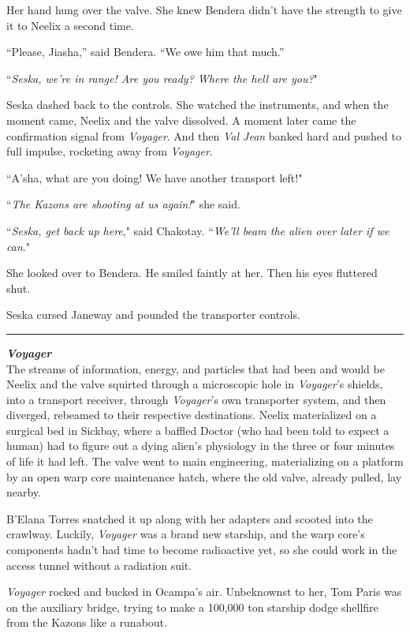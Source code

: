 \documentclass[twoside,letterpaper,12pt]{memoir}
\begin{document}
Her hand hung over the valve. She knew Bendera didn’t have the strength to give it to Neelix a second time.

“Please, Jiasha,” said Bendera. “We owe him that much.”

``\textit{Seska, we're in range! Are you ready? Where the hell are you?}"

Seska dashed back to the controls. She watched the instruments, and when the moment came, Neelix and the valve dissolved. A moment later came the confirmation signal from \textit{Voyager}. And then \textit{Val Jean} banked hard and pushed to full impulse, rocketing away from \textit{Voyager}.

``A'sha, what are you doing! We have another transport left!"

``\textit{The Kazons are shooting at us again!}" she said.

``\textit{Seska, get back up here}," said Chakotay. ``\textit{We'll beam the alien over later if we can}."

She looked over to Bendera. He smiled faintly at her. Then his eyes fluttered shut.

Seska cursed Janeway and pounded the transporter controls.

\begin{center}\rule{3cm}{0.4 pt}\end{center}

\noindent\textit{\textbf{Voyager}}\\

The streams of information, energy, and particles that had been and would be Neelix and the valve squirted through a microscopic hole in \textit{Voyager}'s shields, into a transport receiver, through \textit{Voyager}'s own transporter system, and then diverged, rebeamed to their respective destinations. Neelix materialized on a surgical bed in Sickbay, where a baffled Doctor (who had been told to expect a human) had to figure out a dying alien's physiology in the three or four minutes of life it had left. The valve went to main engineering, materializing on a platform by an open warp core maintenance hatch, where the old valve, already pulled, lay nearby.

B'Elana Torres snatched it up along with her adapters and scooted into the crawlway. Luckily, \textit{Voyager} was a brand new starship, and the warp core's components hadn't had time to become radioactive yet, so she could work in the access tunnel without a radiation suit.

\textit{Voyager} rocked and bucked in Ocampa's air. Unbeknownst to her, Tom Paris was on the auxiliary bridge, trying to make a 100,000 ton starship dodge shellfire from the Kazons like a runabout.
\end{document}
